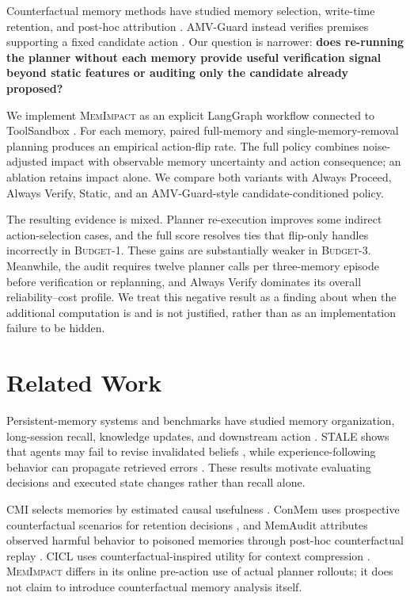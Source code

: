 \documentclass[11pt]{article}
\newcommand{\method}{\textsc{MemImpact}\xspace}
\newcommand{\BOne}{\textsc{Budget-1}\xspace}
\newcommand{\BThree}{\textsc{Budget-3}\xspace}
\begin{document}
Counterfactual memory methods have studied memory selection, write-time retention, and post-hoc attribution \cite{srivastava2026cmi,zhang2026conmem,tan2026memaudit}. AMV-Guard instead verifies premises supporting a fixed candidate action \cite{wang2026amv}. Our question is narrower: \textbf{does re-running the planner without each memory provide useful verification signal beyond static features or auditing only the candidate already proposed?}

We implement \method as an explicit LangGraph workflow connected to ToolSandbox \cite{lu2025toolsandbox}. For each memory, paired full-memory and single-memory-removal planning produces an empirical action-flip rate. The full policy combines noise-adjusted impact with observable memory uncertainty and action consequence; an ablation retains impact alone. We compare both variants with Always Proceed, Always Verify, Static, and an AMV-Guard-style candidate-conditioned policy.

The resulting evidence is mixed. Planner re-execution improves some indirect action-selection cases, and the full score resolves ties that flip-only handles incorrectly in \BOne. These gains are substantially weaker in \BThree. Meanwhile, the audit requires twelve planner calls per three-memory episode before verification or replanning, and Always Verify dominates its overall reliability--cost profile. We treat this negative result as a finding about when the additional computation is and is not justified, rather than as an implementation failure to be hidden.

\section{Related Work}

Persistent-memory systems and benchmarks have studied memory organization, long-session recall, knowledge updates, and downstream action \cite{packer2023memgpt,xu2025amem,wu2025longmemeval,he2026memoryarena}. STALE shows that agents may fail to revise invalidated beliefs \cite{chao2026stale}, while experience-following behavior can propagate retrieved errors \cite{xiong2026memory}. These results motivate evaluating decisions and executed state changes rather than recall alone.

CMI selects memories by estimated causal usefulness \cite{srivastava2026cmi}. ConMem uses prospective counterfactual scenarios for retention decisions \cite{zhang2026conmem}, and MemAudit attributes observed harmful behavior to poisoned memories through post-hoc counterfactual replay \cite{tan2026memaudit}. CICL uses counterfactual-inspired utility for context compression \cite{guan2026cicl}. \method differs in its online pre-action use of actual planner rollouts; it does not claim to introduce counterfactual memory analysis itself.
\end{document}
